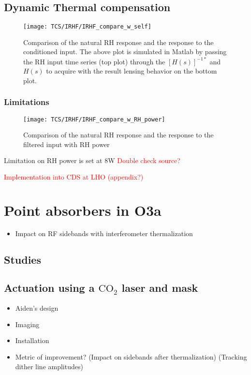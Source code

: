\subsection{Dynamic Thermal compensation}
\begin{figure}[H]
\texttt{[image: TCS/IRHF/IRHF\_compare\_w\_self]}
\caption{Comparison of the natural RH response and the response to the conditioned input. The above plot is simulated in Matlab by passing the RH input time series (top plot) through the $[H(s)]^{-1*}$ and $H(s)$ to acquire with the result lensing behavior on the bottom plot.}
\label{fig:dynam_comparison}
\end{figure}
\newpage


\subsubsection{Limitations}
\begin{figure}[H]
\texttt{[image: TCS/IRHF/IRHF\_compare\_w\_RH\_power]}
\caption{Comparison of the natural RH response and the response to the filtered input with RH power}
\label{fig:RH_power}
\end{figure}
Limitation on RH power is set at 8W \textcolor{red}{Double check source?}

\textcolor{red}{Implementation into CDS at LHO (appendix?)}


\section{Point absorbers in O3a}

\begin{itemize}
\item Impact on RF sidebands with interferometer thermalization
\end{itemize}

\subsection{Studies}

\subsection{Actuation using a $\mathrm{CO_2}$ laser and mask}
\begin{itemize}
\item Aiden's design
\item Imaging
\item Installation

\item Metric of improvement? (Impact on sidebands after thermalization) (Tracking dither line amplitudes)
\end{itemize}
